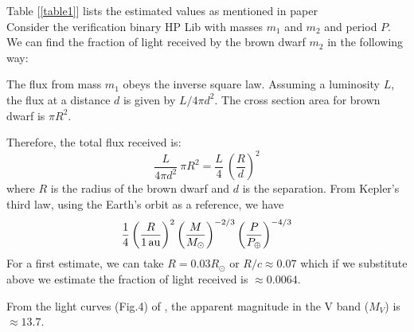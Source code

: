 \documentclass[10pt,a4paper]{article}
\begin{document}
Table [\ref{table1}] lists the estimated values as mentioned in paper \cite{Roelofs}\\



Consider the verification binary HP Lib with masses $m_1$ and $m_2$
and period $P$. We can find the fraction of light received by the
brown dwarf $m_2$ in the following way:

The flux from mass $m_1$ obeys the inverse square law. Assuming a
luminosity $L$, the flux at a distance $d$ is given by $L/4 \pi
d^2$. The cross section area for brown dwarf is $\pi R^2$.

Therefore, the total flux received is:
\begin{equation}
\frac{L}{4 \pi d^2} \ \pi R^2 = \frac{L}{4} \ \left(\frac{R}{d}\right)^2
\end{equation}
where $R$ is the radius of the brown dwarf and $d$ is the separation.
From Kepler's third law, using the Earth's orbit as a reference, we have
\begin{equation}
  \frac{1}{4} \left(\frac{R}{\rm 1\,au}\right)^2
  \left(\frac{M}{M_{\odot}}\right)^{-2/3}
  \left(\frac{P}{P_{\oplus}}\right)^{-4/3}
\end{equation}
For a first estimate, we can take $R = 0.03R_\odot$ or $R/c \approx
0.07$ which if we substitute above we estimate the fraction of light
received is $\approx 0.0064$.

From the light curves (Fig.4) of \citep{Patterson}, the apparent magnitude in the V band ($M_V$) is $\approx 13.7$.

\def\pasp{PASP}



\end{document}
